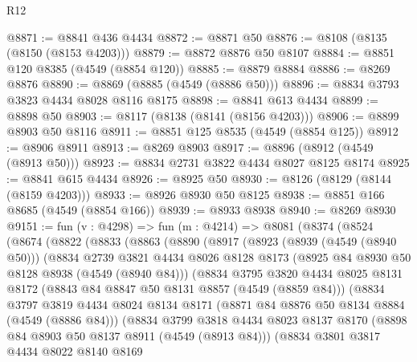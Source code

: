\begin{lexlean}{R12}
\begin{coremodule}
@8871 := @8841 @436 @4434
@8872 := @8871 @50
@8876 := @8108 (@8135 (@8150 (@8153 @4203)))
@8879 := @8872 @8876 @50 @8107
@8884 := @8851 @120 @8385 (@4549 (@8854 @120))
@8885 := @8879 @8884
@8886 := @8269 @8876
@8890 := @8869 (@8885 (@4549 (@8886 @50)))
@8896 := @8834 @3793 @3823 @4434 @8028 @8116 @8175
@8898 := @8841 @613 @4434
@8899 := @8898 @50
@8903 := @8117 (@8138 (@8141 (@8156 @4203)))
@8906 := @8899 @8903 @50 @8116
@8911 := @8851 @125 @8535 (@4549 (@8854 @125))
@8912 := @8906 @8911
@8913 := @8269 @8903
@8917 := @8896 (@8912 (@4549 (@8913 @50)))
@8923 := @8834 @2731 @3822 @4434 @8027 @8125 @8174
@8925 := @8841 @615 @4434
@8926 := @8925 @50
@8930 := @8126 (@8129 (@8144 (@8159 @4203)))
@8933 := @8926 @8930 @50 @8125
@8938 := @8851 @166 @8685 (@4549 (@8854 @166))
@8939 := @8933 @8938
@8940 := @8269 @8930
@9151 := fun (v : @4298) =>
  fun (m : @4214) =>
  @8081
    (@8374
      (@8524
        (@8674
          (@8822
            (@8833
              (@8863
                (@8890
                  (@8917
                    (@8923
                      (@8939 (@4549 (@8940 @50)))
                      (@8834
                        @2739
                        @3821
                        @4434
                        @8026
                        @8128
                        @8173
                        (@8925 @84 @8930 @50 @8128 @8938 (@4549 (@8940 @84)))
                        (@8834
                          @3795
                          @3820
                          @4434
                          @8025
                          @8131
                          @8172
                          (@8843 @84 @8847 @50 @8131 @8857 (@4549 (@8859 @84)))
                          (@8834
                            @3797
                            @3819
                            @4434
                            @8024
                            @8134
                            @8171
                            (@8871 @84 @8876 @50 @8134 @8884 (@4549 (@8886 @84)))
                            (@8834
                              @3799
                              @3818
                              @4434
                              @8023
                              @8137
                              @8170
                              (@8898 @84 @8903 @50 @8137 @8911 (@4549 (@8913 @84)))
                              (@8834
                                @3801
                                @3817
                                @4434
                                @8022
                                @8140
                                @8169

\end{coremodule}
\end{lexlean}
